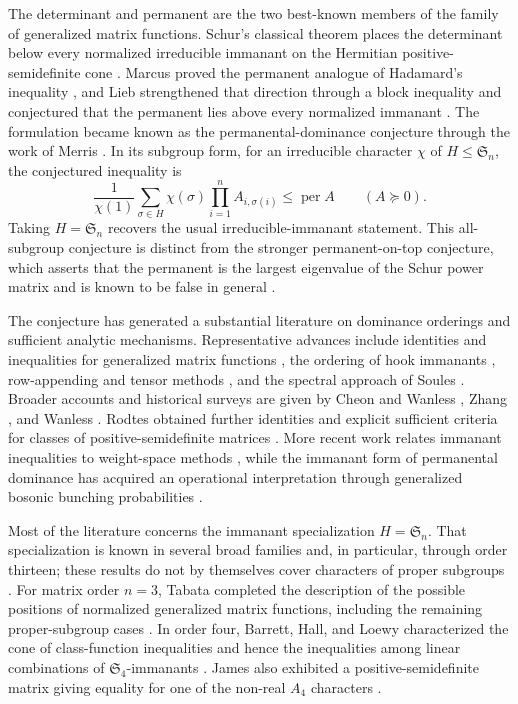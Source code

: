 \documentclass[10pt,twoside]{siamart1116}
\newcommand{\Sn}{\mathfrak S}
\newcommand{\per}{\operatorname{per}}
\newcommand{\psd}{\succeq 0}
\begin{document}
The determinant and permanent are the two best-known members of the family
of generalized matrix functions.  Schur's classical theorem places the
determinant below every normalized irreducible immanant on the Hermitian
positive-semidefinite cone \cite{schur1918}.  Marcus proved the permanent
analogue of Hadamard's inequality \cite{marcus1963}, and Lieb strengthened
that direction through a block inequality and conjectured that the permanent
lies above every normalized immanant \cite{lieb1966}.  The formulation became
known as the permanental-dominance conjecture through the work of Merris
\cite{merris1987}.  In its subgroup form, for an irreducible character $\chi$
of $H\leq\Sn_n$, the conjectured inequality is
\[
  \frac{1}{\chi(1)}
  \sum_{\sigma\in H}\chi(\sigma)\prod_{i=1}^n A_{i,\sigma(i)}
  \leq \per A
  \qquad (A\psd).
\]
Taking $H=\Sn_n$ recovers the usual irreducible-immanant statement.
This all-subgroup conjecture is distinct from the stronger
permanent-on-top conjecture, which asserts that the permanent is the largest
eigenvalue of the Schur power matrix and is known to be false in general
\cite{wanless2022}.

The conjecture has generated a substantial literature on dominance
orderings and sufficient analytic mechanisms.  Representative advances
include identities and inequalities for generalized matrix functions
\cite{merriswatkins1985}, the ordering of hook immanants
\cite{heyfron1988}, row-appending and tensor methods
\cite{pate1991,pate1998,pate1999}, and the spectral approach of Soules
\cite{soules1994}.  Broader accounts and historical surveys are given by
Cheon and Wanless \cite{cheonwanless2005}, Zhang \cite{zhang2016}, and
Wanless \cite{wanless2022}.  Rodtes obtained further identities and explicit
sufficient criteria for classes of positive-semidefinite matrices
\cite{rodtes2024}.  More recent work relates immanant inequalities to
weight-space methods \cite{jingliu2025}, while the immanant form of
permanental dominance has acquired an operational interpretation through
generalized bosonic bunching probabilities \cite{gellerknill2026}.

Most of the literature concerns the immanant specialization $H=\Sn_n$.
That specialization is known in several broad families and, in particular,
through order thirteen; these results do not by themselves cover characters
of proper subgroups \cite{pate1998,zhang2016,wanless2022}.  For matrix order
$n=3$, Tabata
completed the description of the possible positions of normalized
generalized matrix functions, including the remaining proper-subgroup cases
\cite{tabata2015}.  In order four, Barrett, Hall, and Loewy characterized the
cone of class-function inequalities and hence the inequalities among linear
combinations of $\Sn_4$-immanants \cite{barretthallloewy1999}.  James also
exhibited a positive-semidefinite matrix giving equality for one of the
non-real $A_4$ characters
\cite{james1992,cheonwanless2005,wanless2022}.
\end{document}
